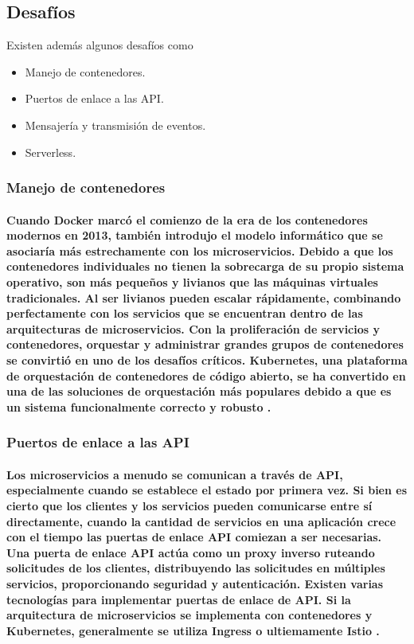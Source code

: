 \subsection{Desafíos}
Existen además algunos desafíos como \cite{ibmmicroservicios}
\begin{itemize}
    \item Manejo de contenedores.
    \item Puertos de enlace a las API.
    \item Mensajería y transmisión de eventos.
    \item Serverless.
\end{itemize}

\subsubsection{Manejo de contenedores}
\paragraph{
    Cuando Docker marcó el comienzo de la era de los contenedores modernos en 2013, también introdujo el modelo informático que se asociaría más estrechamente con los microservicios. Debido a que los contenedores individuales no tienen la sobrecarga de su propio sistema operativo, son más pequeños y livianos que las máquinas virtuales tradicionales. Al ser livianos pueden escalar rápidamente, combinando perfectamente con los servicios que se encuentran dentro de las arquitecturas de microservicios.
    Con la proliferación de servicios y contenedores, orquestar y administrar grandes grupos de contenedores se convirtió en uno de los desafíos críticos. Kubernetes, una plataforma de orquestación de contenedores de código abierto, se ha convertido en una de las soluciones de orquestación más populares debido a que es un sistema funcionalmente correcto y robusto \cite{ibmmicroservicios}.
}

\subsubsection{Puertos de enlace a las API}
\paragraph{
    Los microservicios a menudo se comunican a través de API, especialmente cuando se establece el estado por primera vez. Si bien es cierto que los clientes y los servicios pueden comunicarse entre sí directamente, cuando la cantidad de servicios en una aplicación crece con el tiempo las puertas de enlace API comiezan a ser necesarias. Una puerta de enlace API actúa como un proxy inverso ruteando solicitudes de los clientes, distribuyendo las solicitudes en múltiples servicios, proporcionando seguridad y autenticación.
    Existen varias tecnologías para implementar puertas de enlace de API. Si la arquitectura de microservicios se implementa con contenedores y Kubernetes, generalmente se utiliza Ingress o ultiemamente Istio 
    \cite{ibmmicroservicios}.
}

